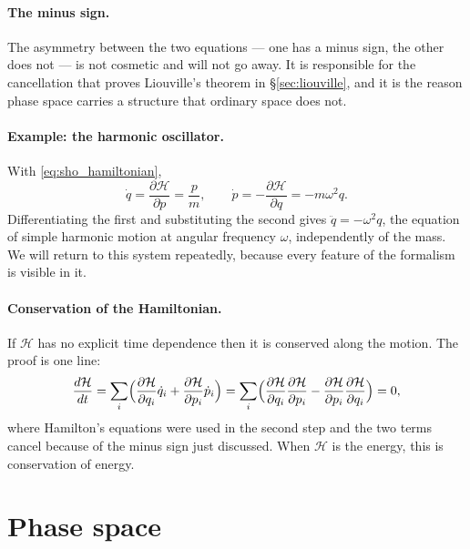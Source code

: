 \documentclass[12pt]{article}
\newcommand{\Ham}{\mathcal{H}}
\begin{document}
\paragraph{The minus sign.}  The asymmetry between the two equations
--- one has a minus sign, the other does not --- is not cosmetic and
will not go away.  It is responsible for the cancellation that proves
Liouville's theorem in \S\ref{sec:liouville}, and it is the reason
phase space carries a structure that ordinary space does not.

\paragraph{Example: the harmonic oscillator.}  With
\eqref{eq:sho_hamiltonian},
%
\begin{equation}
  \dot q = \frac{\partial\Ham}{\partial p} = \frac{p}{m} ,
  \qquad
  \dot p = -\frac{\partial\Ham}{\partial q} = -m\omega^2 q .
\end{equation}
%
Differentiating the first and substituting the second gives
$\ddot q = -\omega^2 q$, the equation of simple harmonic motion at
angular frequency $\omega$, independently of the mass.  We will return
to this system repeatedly, because every feature of the formalism is
visible in it.

\paragraph{Conservation of the Hamiltonian.}  If $\Ham$ has no explicit
time dependence then it is conserved along the motion.  The proof is
one line:
%
\begin{equation}
  \frac{d\Ham}{dt}
   = \sum_i\Bigl(\frac{\partial\Ham}{\partial q_i}\dot q_i
   + \frac{\partial\Ham}{\partial p_i}\dot p_i\Bigr)
   = \sum_i\Bigl(\frac{\partial\Ham}{\partial q_i}
       \frac{\partial\Ham}{\partial p_i}
   - \frac{\partial\Ham}{\partial p_i}
       \frac{\partial\Ham}{\partial q_i}\Bigr) = 0 ,
  \label{eq:H_conserved}
\end{equation}
%
where Hamilton's equations were used in the second step and the two
terms cancel because of the minus sign just discussed.  When $\Ham$ is
the energy, this is conservation of energy.

\section{Phase space}
\label{sec:phase_space}
\end{document}

